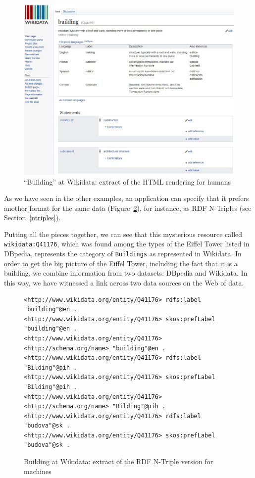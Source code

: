 \begin{figure}
    \centering
    \includegraphics[width=5.0in]{media/ch5/figure-05-09.jpg}
    \caption{``Building'' at Wikidata: extract of the HTML rendering for humans}
    \label{fig:ch5.9}
\end{figure}

As we have seen in the other examples, an application can specify that it prefers  another format for 
the same data (Figure~\ref{fig:ch5.10}), for
instance,  as  RDF N-Triples (see Section~\ref{ntriples}).  

Putting  all the pieces
together, we can see that this mysterious resource called \texttt{wikidata:Q41176},
which  was found among the types of the Eiffel Tower listed in DBpedia, represents the
category of \texttt{Buildings} as represented in  Wikidata.   
In order to get the big picture of the Eiffel Tower, 
including the fact that it is a building, we combine information from two datasets: DBpedia and Wikidata. 
In this way, we have
witnessed a link across two data sources on the Web of data.

\begin{figure}
 \begin{lstlisting}
<http://www.wikidata.org/entity/Q41176> rdfs:label "building"@en .
<http://www.wikidata.org/entity/Q41176> skos:prefLabel "building"@en .
<http://www.wikidata.org/entity/Q41176> <http://schema.org/name> "building"@en .
<http://www.wikidata.org/entity/Q41176> rdfs:label "Bilding"@pih .
<http://www.wikidata.org/entity/Q41176> skos:prefLabel "Bilding"@pih .
<http://www.wikidata.org/entity/Q41176> <http://schema.org/name> "Bilding"@pih .
<http://www.wikidata.org/entity/Q41176> rdfs:label "budova"@sk .
<http://www.wikidata.org/entity/Q41176> skos:prefLabel "budova"@sk .
\end{lstlisting}
    \caption{Building at Wikidata: extract of the RDF N-Triple version for
machines}
    \label{fig:ch5.10}
\end{figure}




